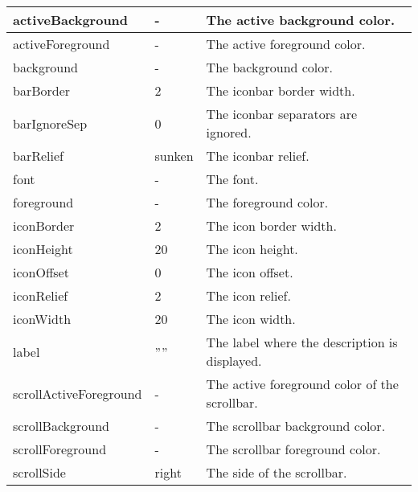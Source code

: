 {\newpage
\clearpage
\samepage \begin{supertabular}{|l|l|p{5.5cm}|}
activeBackground       & -       & The active background
                                   color.\\  \hline
activeForeground       & -       & The active foreground
                                   color.\\  \hline
background             & -       & The background color.\\  \hline
barBorder              & 2       & The iconbar border
                                   width.\\  \hline
barIgnoreSep           & 0       & The iconbar separators
                                   are ignored.\\  \hline
barRelief              & sunken  & The iconbar relief.\\  \hline
font                   & -       & The font.\\  \hline
foreground             & -       & The foreground color.\\  \hline
iconBorder             & 2       & The icon border width.\\  \hline
iconHeight             & 20      & The icon height.\\  \hline
iconOffset             & 0       & The icon offset.\\  \hline
iconRelief             & 2       & The icon relief.\\  \hline
iconWidth              & 20      & The icon width.\\  \hline
label                  & ''''    & The label where the
                                   description is
                                   displayed.\\  \hline
scrollActiveForeground & -       & The active foreground
                                   color of the scrollbar.\\  \hline 
scrollBackground       & -       & The scrollbar background
                                   color.\\  \hline
scrollForeground       & -       & The scrollbar foreground
                                   color.\\  \hline
scrollSide             & right   & The side of the
                                   scrollbar.\\  \hline
\end{supertabular}
}

{\newpage
\clearpage
\samepage \begin{figure}[ht]
  \centerline{
  \epsfysize=1.2cm
  }
  
  \label{fig:IconBar}
\end{figure}
}

